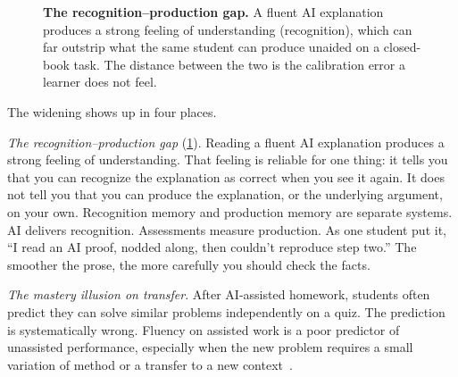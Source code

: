 \documentclass{SIAMbook2023}
\begin{document}
\begin{figure}[ht]
\centering
{}
\caption{\textbf{The recognition--production gap.} A fluent AI explanation produces a strong feeling of understanding (recognition), which can far outstrip what the same student can produce unaided on a closed-book task. The distance between the two is the calibration error a learner does not feel.}
\label{fig:recognition-production}
\end{figure}

The widening shows up in four places.

\emph{The recognition--production gap} (\cref{fig:recognition-production}). Reading a fluent AI explanation produces a strong feeling of understanding. That feeling is reliable for one thing: it tells you that you can recognize the explanation as correct when you see it again. It does not tell you that you can produce the explanation, or the underlying argument, on your own. Recognition memory and production memory are separate systems. AI delivers recognition. Assessments measure production. As one student put it, ``I read an AI proof, nodded along, then couldn't reproduce step two.'' The smoother the prose, the more carefully you should check the facts.

\emph{The mastery illusion on transfer}. After AI-assisted homework, students often predict they can solve similar problems independently on a quiz. The prediction is systematically wrong. Fluency on assisted work is a poor predictor of unassisted performance, especially when the new problem requires a small variation of method or a transfer to a new context~\citep{dunlosky2009metacognition}.
\end{document}
